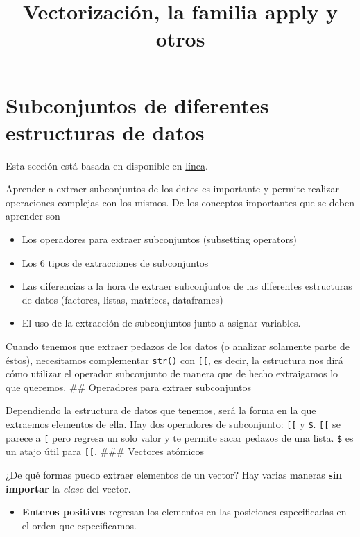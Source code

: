 \documentclass[]{article}
\title{Vectorización, la familia apply y otros}
\author{}
\date{}
\begin{document}
\maketitle


\section{Subconjuntos de diferentes estructuras de
datos}\label{subconjuntos-de-diferentes-estructuras-de-datos}

Esta sección está basada en \textcite[Subsetting]{wickham2014advanced}
disponible en
\href{http://adv-r.had.co.nz/Subsetting.html\#subsetting-operators}{línea}.

Aprender a extraer subconjuntos de los datos es importante y permite
realizar operaciones complejas con los mismos. De los conceptos
importantes que se deben aprender son

\begin{itemize}
\itemsep1pt\parskip0pt
\item
  Los operadores para extraer subconjuntos (subsetting operators)
\item
  Los 6 tipos de extracciones de subconjuntos
\item
  Las diferencias a la hora de extraer subconjuntos de las diferentes
  estructuras de datos (factores, listas, matrices, dataframes)
\item
  El uso de la extracción de subconjuntos junto a asignar variables.
\end{itemize}

Cuando tenemos que extraer pedazos de los datos (o analizar solamente
parte de éstos), necesitamos complementar \texttt{str()} con
\texttt{{[}{[}}, es decir, la estructura nos dirá cómo utilizar el
operador subconjunto de manera que de hecho extraigamos lo que queremos.
\#\# Operadores para extraer subconjuntos

Dependiendo la estructura de datos que tenemos, será la forma en la que
extraemos elementos de ella. Hay dos operadores de subconjunto:
\texttt{{[}{[}} y \texttt{\$}. \texttt{{[}{[}} se parece a \texttt{{[}}
pero regresa un solo valor y te permite sacar pedazos de una lista.
\texttt{\$} es un atajo útil para \texttt{{[}{[}}. \#\#\# Vectores
atómicos

¿De qué formas puedo extraer elementos de un vector? Hay varias maneras
\textbf{sin importar} la \emph{clase} del vector.

\begin{itemize}
\itemsep1pt\parskip0pt
\item
  \textbf{Enteros positivos} regresan los elementos en las posiciones
  especificadas en el orden que especificamos.
\end{itemize}
\end{document}
